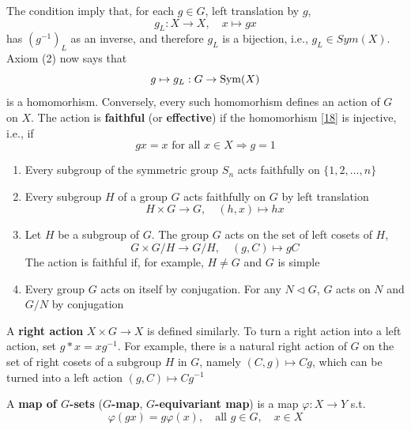 \documentclass[11pt]{article}
\begin{document}
The condition imply that, for each \(g\in G\), left translation by \(g\),
\begin{equation*}
g_L:X\to X,\quad x\mapsto gx
\end{equation*}
has \((g^{-1})_L\) as an inverse, and therefore \(g_L\) is a bijection, i.e., \(g_L\in Sym(X)\).
Axiom (2) now says that
\begin{equation}
g\mapsto g_L:G\to\operatorname{Sym}(X)\label{18}
\end{equation}
is a homomorhism. Conversely, every such homomorhism defines an action of \(G\) on \(X\). The
action is \textbf{faithful} (or \textbf{effective}) if the homomorhism \eqref{18} is injective, i.e., if
\begin{equation*}
gx=x\text{ for all }x\in X\Rightarrow g=1
\end{equation*}

\begin{examplle}[]
\begin{enumerate}
\item Every subgroup of the symmetric group \(S_n\) acts faithfully on \(\{1,2,\dots,n\}\)
\item Every subgroup \(H\) of a group \(G\) acts faithfully on \(G\) by left translation
\begin{equation*}
H\times G\to G,\quad(h,x)\mapsto hx
\end{equation*}
\item Let \(H\) be a subgroup of \(G\). The group \(G\) acts on the set of left cosets of \(H\),
\begin{equation*}
G\times G/H\to G/H,\quad(g,C)\mapsto gC
\end{equation*}
The action is faithful if, for example, \(H\neq G\) and \(G\) is simple
\item Every group \(G\) acts on itself by conjugation. For any \(N\lhd G\), \(G\) acts on \(N\)
and \(G/N\) by conjugation
\end{enumerate}
\end{examplle}

A \textbf{right action} \(X\times G\to X\) is defined similarly. To turn a right action into a left action,
set \(g*x=xg^{-1}\). For example, there is a natural right action of \(G\) on the set of right
cosets of a subgroup \(H\) in \(G\), namely \((C,g)\mapsto Cg\), which can be turned into a left
action \((g,C)\mapsto Cg^{-1}\)

A \textbf{map of \(G\)-sets} (\textbf{\(G\)-map}, \textbf{\(G\)-equivariant map}) is a map \(\varphi:X\to Y\) s.t.
\begin{equation*}
\varphi(gx)=g\varphi(x),\quad\text{all }g\in G,\quad x\in X
\end{equation*}
\end{document}
